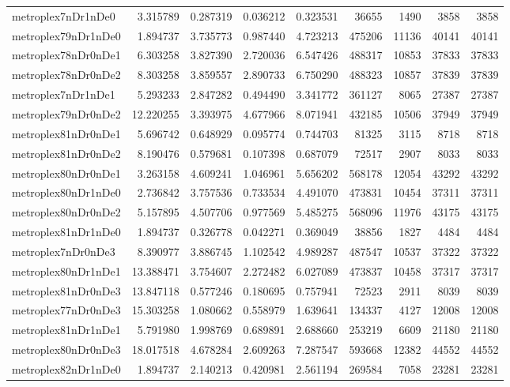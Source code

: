 \documentclass[../../../thesis.tex]{subfiles}
\begin{document}
\begin{longtable}{|l|r|r|r|r|r|r|r|r|}
metroplex7nDr1nDe0 & 3.315789 & 0.287319 & 0.036212 & 0.323531 & 36655 & 1490 & 3858 & 3858 \\
metroplex79nDr1nDe0 & 1.894737 & 3.735773 & 0.987440 & 4.723213 & 475206 & 11136 & 40141 & 40141 \\
metroplex78nDr0nDe1 & 6.303258 & 3.827390 & 2.720036 & 6.547426 & 488317 & 10853 & 37833 & 37833 \\
metroplex78nDr0nDe2 & 8.303258 & 3.859557 & 2.890733 & 6.750290 & 488323 & 10857 & 37839 & 37839 \\
metroplex7nDr1nDe1 & 5.293233 & 2.847282 & 0.494490 & 3.341772 & 361127 & 8065 & 27387 & 27387 \\
metroplex79nDr0nDe2 & 12.220255 & 3.393975 & 4.677966 & 8.071941 & 432185 & 10506 & 37949 & 37949 \\
metroplex81nDr0nDe1 & 5.696742 & 0.648929 & 0.095774 & 0.744703 & 81325 & 3115 & 8718 & 8718 \\
metroplex81nDr0nDe2 & 8.190476 & 0.579681 & 0.107398 & 0.687079 & 72517 & 2907 & 8033 & 8033 \\
metroplex80nDr0nDe1 & 3.263158 & 4.609241 & 1.046961 & 5.656202 & 568178 & 12054 & 43292 & 43292 \\
metroplex80nDr1nDe0 & 2.736842 & 3.757536 & 0.733534 & 4.491070 & 473831 & 10454 & 37311 & 37311 \\
metroplex80nDr0nDe2 & 5.157895 & 4.507706 & 0.977569 & 5.485275 & 568096 & 11976 & 43175 & 43175 \\
metroplex81nDr1nDe0 & 1.894737 & 0.326778 & 0.042271 & 0.369049 & 38856 & 1827 & 4484 & 4484 \\
metroplex7nDr0nDe3 & 8.390977 & 3.886745 & 1.102542 & 4.989287 & 487547 & 10537 & 37322 & 37322 \\
metroplex80nDr1nDe1 & 13.388471 & 3.754607 & 2.272482 & 6.027089 & 473837 & 10458 & 37317 & 37317 \\
metroplex81nDr0nDe3 & 13.847118 & 0.577246 & 0.180695 & 0.757941 & 72523 & 2911 & 8039 & 8039 \\
metroplex77nDr0nDe3 & 15.303258 & 1.080662 & 0.558979 & 1.639641 & 134337 & 4127 & 12008 & 12008 \\
metroplex81nDr1nDe1 & 5.791980 & 1.998769 & 0.689891 & 2.688660 & 253219 & 6609 & 21180 & 21180 \\
metroplex80nDr0nDe3 & 18.017518 & 4.678284 & 2.609263 & 7.287547 & 593668 & 12382 & 44552 & 44552 \\
metroplex82nDr1nDe0 & 1.894737 & 2.140213 & 0.420981 & 2.561194 & 269584 & 7058 & 23281 & 23281 \\

\end{longtable}
\end{document}
